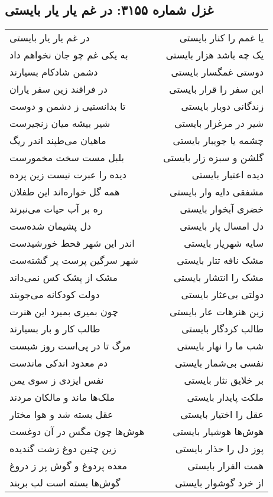 \begin{center}
\section*{غزل شماره ۳۱۵۵: در غم یار یار بایستی}
\label{sec:3155}
\begin{longtable}{l p{0.5cm} r}
در غم یار یار بایستی
&&
یا غمم را کنار بایستی
\\
به یکی غم چو جان نخواهم داد
&&
یک چه باشد هزار بایستی
\\
دشمن شادکام بسیارند
&&
دوستی غمگسار بایستی
\\
در فراقند زین سفر یاران
&&
این سفر را قرار بایستی
\\
تا بدانستیی ز دشمن و دوست
&&
زندگانی دوبار بایستی
\\
شیر بیشه میان زنجیرست
&&
شیر در مرغزار بایستی
\\
ماهیان می‌طپند اندر ریگ
&&
چشمه یا جویبار بایستی
\\
بلبل مست سخت مخمورست
&&
گلشن و سبزه زار بایستی
\\
دیده را عبرت نیست زین پرده
&&
دیده اعتبار بایستی
\\
همه گل خواره‌اند این طفلان
&&
مشفقی دایه وار بایستی
\\
ره بر آب حیات می‌نبرند
&&
خضری آبخوار بایستی
\\
دل پشیمان شده‌ست
&&
دل امسال پار بایستی
\\
اندر این شهر قحط خورشیدست
&&
سایه شهریار بایستی
\\
شهر سرگین پرست پر گشته‌ست
&&
مشک نافه تتار بایستی
\\
مشک از پشک کس نمی‌داند
&&
مشک را انتشار بایستی
\\
دولت کودکانه می‌جویند
&&
دولتی بی‌عثار بایستی
\\
چون بمیری بمیرد این هنرت
&&
زین هنرهات عار بایستی
\\
طالب کار و بار بسیارند
&&
طالب کردگار بایستی
\\
مرگ تا در پی‌است روز شبست
&&
شب ما را نهار بایستی
\\
دم معدود اندکی ماندست
&&
نفسی بی‌شمار بایستی
\\
نفس ایزدی ز سوی یمن
&&
بر خلایق نثار بایستی
\\
ملک‌ها ماند و مالکان مردند
&&
ملکت پایدار بایستی
\\
عقل بسته شد و هوا مختار
&&
عقل را اختیار بایستی
\\
هوش‌ها چون مگس در آن دوغست
&&
هوش‌ها هوشیار بایستی
\\
زین چنین دوغ زشت گندیده
&&
پوز دل را حذار بایستی
\\
معده پردوغ و گوش پر ز دروغ
&&
همت الفرار بایستی
\\
گوش‌ها بسته است لب بربند
&&
از خرد گوشوار بایستی
\\
\end{longtable}
\end{center}
